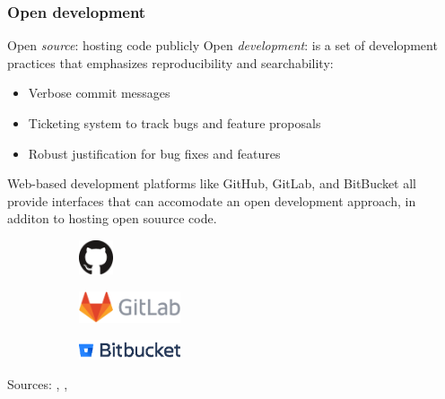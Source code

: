 \begin{frame}
  \frametitle{Open development}
  Open {\it source}: hosting code publicly
  \newline
  \newline
  Open {\it development}: is a set of development practices that emphasizes reproducibility and searchability:
  \begin{itemize}
      \item Verbose commit messages
      \item Ticketing system to track bugs and feature proposals
      \item Robust justification for bug fixes and features
  \end{itemize}
  Web-based development platforms like GitHub, GitLab, and BitBucket all provide interfaces that can accomodate an open development approach, in additon to hosting open souurce code. 
  \begin{figure}[htpb]
      \begin{subfigure}
          \centering
          \includegraphics[width=1cm]{images/github-mark.eps}
      \end{subfigure}
      \begin{subfigure}
          \centering
          \includegraphics[width=3cm]{images/gitlab-logo.eps}
      \end{subfigure}
      \begin{subfigure}
          \centering
          \includegraphics[width=3cm]{images/bitbucket-logo.eps}
      \end{subfigure}
  \end{figure}
  \begin{center}
      {\tiny Sources: \cite{github_logo}, \cite{gitlab_logo}, \cite{bitbucket_logo}}
  \end{center}
\end{frame}

